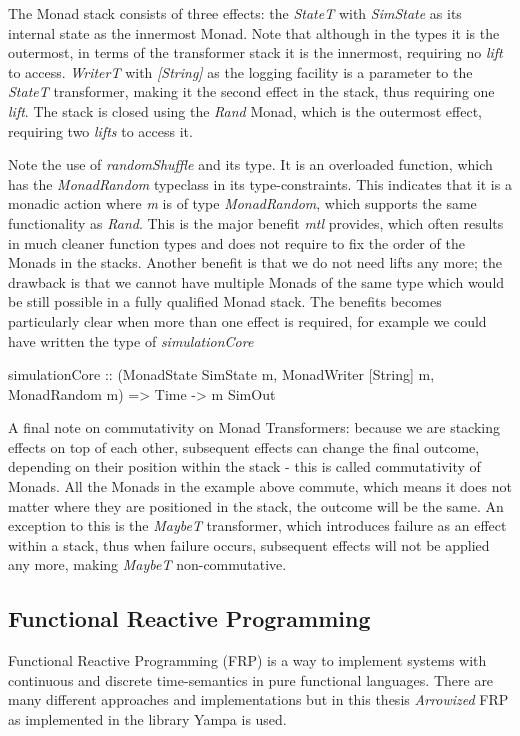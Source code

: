 The Monad stack consists of three effects: the \textit{StateT} with \textit{SimState} as its internal state as the innermost Monad. Note that although in the types it is the outermost, in terms of the transformer stack it is the innermost, requiring no \textit{lift} to access. \textit{WriterT} with \textit{[String]} as the logging facility is a parameter to the \textit{StateT} transformer, making it the second effect in the stack, thus requiring one \textit{lift}. The stack is closed using the \textit{Rand} Monad, which is the outermost effect, requiring two \textit{lifts} to access it.

Note the use of \textit{randomShuffle} and its type. It is an overloaded function, which has the \textit{MonadRandom} typeclass in its type-constraints. This indicates that it is a monadic action where \textit{m} is of type \textit{MonadRandom}, which supports the same functionality as \textit{Rand}. This is the major benefit \textit{mtl} provides, which often results in much cleaner function types and does not require to fix the order of the Monads in the stacks. Another benefit is that we do not need lifts any more; the drawback is that we cannot have multiple Monads of the same type which would be still possible in a fully qualified Monad stack. The benefits becomes particularly clear when more than one effect is required, for example we could have written the type of \textit{simulationCore}

\begin{HaskellCode}
simulationCore :: (MonadState SimState m, MonadWriter [String] m, MonadRandom m) 
               => Time -> m SimOut
\end{HaskellCode}

A final note on commutativity on Monad Transformers: because we are stacking effects on top of each other, subsequent effects can change the final outcome, depending on their position within the stack - this is called commutativity of Monads. All the Monads in the example above commute, which means it does not matter where they are positioned in the stack, the outcome will be the same. An exception to this is the \textit{MaybeT} transformer, which introduces failure as an effect within a stack, thus when failure occurs, subsequent effects will not be applied any more, making \textit{MaybeT} non-commutative. 

\subsection{Functional Reactive Programming}
\label{sec:back_frp}
Functional Reactive Programming (FRP) is a way to implement systems with continuous and discrete time-semantics in pure functional languages. There are many different approaches and implementations but in this thesis \textit{Arrowized} FRP \cite{hughes_generalising_2000, hughes_programming_2005} as implemented in the library Yampa \cite{courtney_yampa_2003,hudak_arrows_2003,nilsson_functional_2002} is used.

